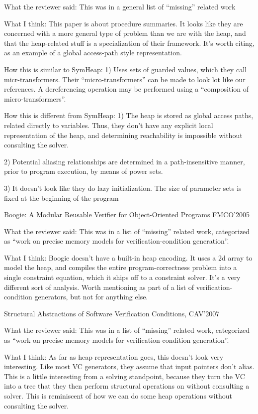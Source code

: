 {What the reviewer said: This was in a general list of “missing” related work

What I think: This paper is about procedure summaries. It looks like they are concerned with a more general type of problem than we are with the heap, and that the heap-related stuff is a specialization of their framework. It’s worth citing, as an example of a global access-path style representation.

How this is similar to SymHeap:
1) Uses sets of guarded values, which they call micr-transformers. Their “micro-transformers” can be made to look lot like our references. A dereferencing operation may be performed using a “composition of micro-transformers”.

How this is different from SymHeap: 
1) The heap is stored as global access paths, related directly to variables. Thus, they don’t have any explicit local representation of the heap, and determining reachability is impossible without consulting the solver.

2) Potential aliasing relationships are determined in a path-insensitive manner, prior to program execution, by means of power sets.

3) It doesn’t look like they do lazy initialization. The size of parameter sets is fixed at the beginning of the program

Boogie: A Modular Reusable Verifier for Object-Oriented Programs FMCO'2005

What the reviewer said: This was in a list of “missing” related work, categorized as “work on precise memory models for verification-condition generation”.

What I think: Boogie doesn’t have a built-in heap encoding. It uses a 2d array to model the heap, and compiles the entire program-correctness problem into a single constraint equation, which it ships off to a constraint solver. It’s a very different sort of analysis. Worth mentioning as part of a list of verification-condition generators, but not for anything else.

Structural Abstractions of Software Verification Conditions, CAV'2007

What the reviewer said: This was in a list of “missing” related work, categorized as “work on precise memory models for verification-condition generation”.

What I think: As far as heap representation goes, this doesn’t look very interesting. Like most VC generators, they assume that input pointers don’t alias. This is a little interesting from a solving standpoint, because they turn the VC into a tree that they then perform structural operations on without consulting a solver. This is reminiscent of how we can do some heap operations without consulting the solver.

}
